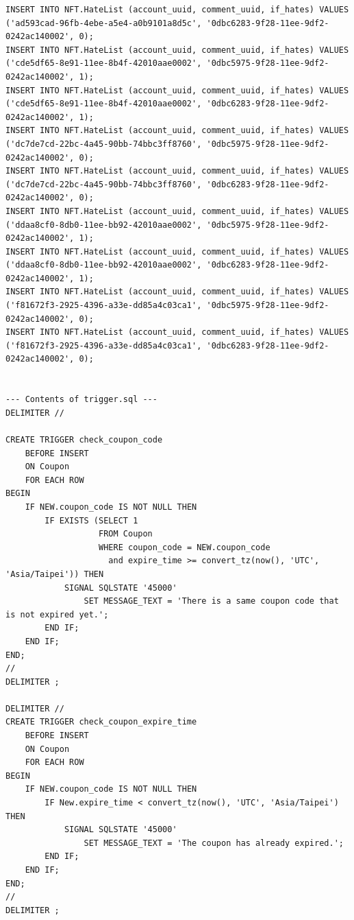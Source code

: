 \documentclass[a4paper, 12pt]{article}
\begin{document}
\begin{lstlisting}
INSERT INTO NFT.HateList (account_uuid, comment_uuid, if_hates) VALUES ('ad593cad-96fb-4ebe-a5e4-a0b9101a8d5c', '0dbc6283-9f28-11ee-9df2-0242ac140002', 0);
INSERT INTO NFT.HateList (account_uuid, comment_uuid, if_hates) VALUES ('cde5df65-8e91-11ee-8b4f-42010aae0002', '0dbc5975-9f28-11ee-9df2-0242ac140002', 1);
INSERT INTO NFT.HateList (account_uuid, comment_uuid, if_hates) VALUES ('cde5df65-8e91-11ee-8b4f-42010aae0002', '0dbc6283-9f28-11ee-9df2-0242ac140002', 1);
INSERT INTO NFT.HateList (account_uuid, comment_uuid, if_hates) VALUES ('dc7de7cd-22bc-4a45-90bb-74bbc3ff8760', '0dbc5975-9f28-11ee-9df2-0242ac140002', 0);
INSERT INTO NFT.HateList (account_uuid, comment_uuid, if_hates) VALUES ('dc7de7cd-22bc-4a45-90bb-74bbc3ff8760', '0dbc6283-9f28-11ee-9df2-0242ac140002', 0);
INSERT INTO NFT.HateList (account_uuid, comment_uuid, if_hates) VALUES ('ddaa8cf0-8db0-11ee-bb92-42010aae0002', '0dbc5975-9f28-11ee-9df2-0242ac140002', 1);
INSERT INTO NFT.HateList (account_uuid, comment_uuid, if_hates) VALUES ('ddaa8cf0-8db0-11ee-bb92-42010aae0002', '0dbc6283-9f28-11ee-9df2-0242ac140002', 1);
INSERT INTO NFT.HateList (account_uuid, comment_uuid, if_hates) VALUES ('f81672f3-2925-4396-a33e-dd85a4c03ca1', '0dbc5975-9f28-11ee-9df2-0242ac140002', 0);
INSERT INTO NFT.HateList (account_uuid, comment_uuid, if_hates) VALUES ('f81672f3-2925-4396-a33e-dd85a4c03ca1', '0dbc6283-9f28-11ee-9df2-0242ac140002', 0);


--- Contents of trigger.sql ---
DELIMITER //

CREATE TRIGGER check_coupon_code
    BEFORE INSERT
    ON Coupon
    FOR EACH ROW
BEGIN
    IF NEW.coupon_code IS NOT NULL THEN
        IF EXISTS (SELECT 1
                   FROM Coupon
                   WHERE coupon_code = NEW.coupon_code
                     and expire_time >= convert_tz(now(), 'UTC', 'Asia/Taipei')) THEN
            SIGNAL SQLSTATE '45000'
                SET MESSAGE_TEXT = 'There is a same coupon code that is not expired yet.';
        END IF;
    END IF;
END;
//
DELIMITER ;

DELIMITER //
CREATE TRIGGER check_coupon_expire_time
    BEFORE INSERT
    ON Coupon
    FOR EACH ROW
BEGIN
    IF NEW.coupon_code IS NOT NULL THEN
        IF New.expire_time < convert_tz(now(), 'UTC', 'Asia/Taipei') THEN
            SIGNAL SQLSTATE '45000'
                SET MESSAGE_TEXT = 'The coupon has already expired.';
        END IF;
    END IF;
END;
//
DELIMITER ;



\end{lstlisting}
\end{document}
